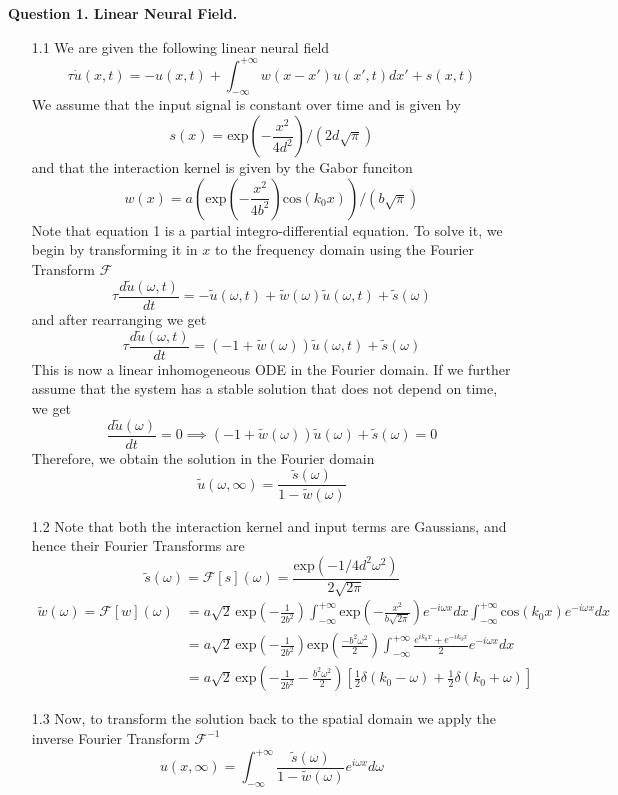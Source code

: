 \documentclass[12pt]{article}
\begin{document}
\noindent


\noindent\textbf{Question 1. Linear Neural Field.}
\begin{enumerate}
\item[1.1] We are given the following linear neural field
\begin{equation}
    \tau \dot{u}(x, t) =   -u(x, t) + \int_{-\infty}^{+\infty}w(x-x')u(x', t)dx' + s(x, t)
\end{equation}
We assume that the input signal is constant over time and is given by 
\begin{equation}
    s(x) = \text{exp}\left(-\frac{x^2}{4d^2}\right)/(2d\sqrt{\pi})
\end{equation}
and that the interaction kernel is given by the Gabor funciton
\begin{equation}
    w(x) = a\left(\text{exp}\left(-\frac{x^2}{4b^2}\right)\text{cos}(k_{0}x)\right)/(b\sqrt{\pi})
\end{equation}
Note that equation 1 is a partial integro-differential equation. To solve it, we begin by transforming it in $x$ to the 
frequency domain using the Fourier Transform $\mathcal{F}$
\[
    \tau \frac{d\widetilde{u}(\omega, t)}{dt} = -\widetilde{u}(\omega, t) + \widetilde{w}(\omega)\widetilde{u}(\omega, t) + \widetilde{s}(\omega)
\]
and after rearranging we get
\[
    \tau \frac{d\widetilde{u}(\omega, t)}{dt} = (-1 + \widetilde{w}(\omega))\widetilde{u}(\omega, t) + \widetilde{s}(\omega)
\]
This is now a linear inhomogeneous ODE in the Fourier domain. If we further assume that the system has a stable solution that does not depend on time,
we get
\[
    \frac{d\widetilde{u}(\omega)}{dt} = 0 \implies (-1 + \widetilde{w}(\omega))\widetilde{u}(\omega) + \widetilde{s}(\omega) = 0
\]
Therefore, we obtain the solution in the Fourier domain
\[
    \widetilde{u}(\omega, \infty) = \frac{\widetilde{s}(\omega)}{1 - \widetilde{w}(\omega)}
\]
\item[1.2] Note that both the interaction kernel and input terms are Gaussians, and hence their Fourier Transforms are 
\[
    \widetilde{s}(\omega) = \mathcal{F}[s](\omega) =  \frac{\text{exp}(-1/4d^{2}\omega^{2})}{2\sqrt{2\pi}}
\]
\begin{align*}
    \widetilde{w}(\omega) = \mathcal{F}[w](\omega) &= a\sqrt{2}\,\text{exp}\left(-\frac{1}{2b^2}\right) \int_{-\infty}^{+\infty}\text{exp}\left(-\frac{x^2}{b\sqrt{2\pi}}\right)e^{-i\omega x}dx\int_{-\infty}^{+\infty}\text{cos}(k_{0}x)e^{-i\omega x}dx\\
                           &= a\sqrt{2}\,\text{exp}\left(-\frac{1}{2b^2}\right)\text{exp}\left(\frac{-b^{2}\omega^{2}}{2}\right)\int_{-\infty}^{+\infty}\frac{e^{ik_{0}x}+e^{-ik_{0}x}}{2}e^{-i\omega x}dx\\
                           &= a\sqrt{2}\,\text{exp}\left(-\frac{1}{2b^2}-\frac{b^{2}\omega^{2}}{2}\right)\left[\frac{1}{2}\delta(k_{0}-\omega) + \frac{1}{2}\delta(k_{0}+\omega)\right]
\end{align*}
\item[1.3] Now, to transform the solution back to the spatial domain we apply the inverse Fourier Transform $\mathcal{F}^{-1}$
\[
    u(x, \infty) = \int_{-\infty}^{+\infty} \frac{\widetilde{s}(\omega)}{1 - \widetilde{w}(\omega)} e^{i\omega x} d\omega 
\]


\end{enumerate}
\end{document}
